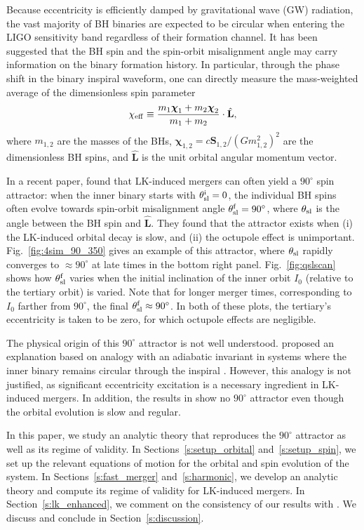 \documentclass[
        twocolumn,
        twocolappendix
    ]{aastex63}
\renewcommand*{\bm}[1]{\boldsymbol{\mathbf{#1}}}
\newcommand*{\uv}[1]{\hat{\bm{#1}}}
\begin{document}
Because eccentricity is efficiently damped by gravitational wave (GW) radiation,
the vast majority of BH binaries are expected to be circular when entering the
LIGO sensitivity band regardless of their formation channel. It has been
suggested that the BH spin and the spin-orbit misalignment angle may carry
information on the binary formation history. In particular, through the phase
shift in the binary inspiral waveform, one can directly measure the
mass-weighted average of the dimensionless spin parameter
\begin{equation}
    \chi_{\rm eff} \equiv \frac{m_1\bm{\chi}_1 + m_2\bm{\chi}_2}{m_1 + m_2}
        \cdot \uv{L},
\end{equation}
where $m_{1,2}$ are the masses of the BHs, $\bm{\chi}_{1,2} = c\bm{S}_{1,2} /
(Gm_{1,2}^2)^2$ are the dimensionless BH spins, and $\uv{L}$ is the unit orbital
angular momentum vector.

In a recent paper, \citet{bin2} found that LK-induced mergers can often yield a
$90^\circ$ spin attractor: when the inner binary starts with $\theta_{\rm
sl}^{\rm i} = 0$, the individual BH spins often evolve towards spin-orbit
misalignment angle $\theta_{\rm sl}^{\rm f} = 90^\circ$, where $\theta_{\rm sl}$
is the angle between the BH spin and $\uv{L}$. They found that the attractor
exists when (i) the LK-induced orbital decay is slow, and (ii) the octupole
effect is unimportant. Fig.~\ref{fig:4sim_90_350} gives an example of this
attractor, where $\theta_{\rm sl}$ rapidly converges to $\approx 90^\circ$ at
late times in the bottom right panel. Fig.~\ref{fig:qslscan} shows how
$\theta_{\rm sl}^{\rm f}$ varies when the initial inclination of the inner orbit
$I_0$ (relative to the tertiary orbit) is varied. Note that for longer merger
times, corresponding to $I_0$ farther from $90^\circ$, the final $\theta_{\rm
sl}^{\rm f} \approx 90^\circ$. In both of these plots, the tertiary's
eccentricity is taken to be zero, for which octupole effects are negligible.

The physical origin of this $90^\circ$ attractor is not well understood.
\citet{bin2} proposed an explanation based on analogy with an adiabatic
invariant in systems where the inner binary remains circular through the
inspiral \citep{bin1}. However, this analogy is not justified, as significant
eccentricity excitation is a necessary ingredient in LK-induced mergers. In
addition, the results in \citet{bin1} show no $90^\circ$ attractor even though
the orbital evolution is slow and regular.

In this paper, we study an analytic theory that reproduces the $90^\circ$
attractor as well as its regime of validity. In Sections~\ref{s:setup_orbital}
and~\ref{s:setup_spin}, we set up the relevant equations of motion for the
orbital and spin evolution of the system. In Sections~\ref{s:fast_merger}
and~\ref{s:harmonic}, we develop an analytic theory and compute its regime of
validity for LK-induced mergers. In Section~\ref{s:lk_enhanced}, we comment on
the consistency of our results with \citet{bin1}. We discuss and conclude in
Section~\ref{s:discussion}.
\end{document}
